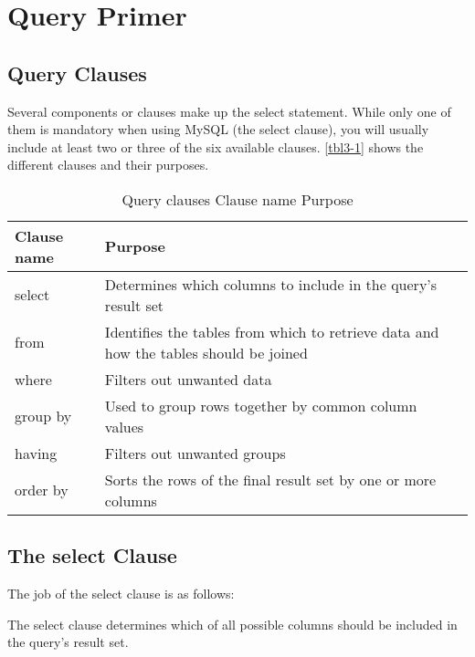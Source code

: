 \chapter{Query Primer\label{Ch03}}
\section{Query Clauses}
Several components or clauses make up the select statement. While only one of them is mandatory when using MySQL (the select clause), you will usually include at least two or three of the six available clauses. \autoref{tbl3-1} shows the different clauses and their purposes.
\begin{table}
    \centering
    \caption{Query clauses Clause name Purpose}
    \label{tbl3-1}
    \begin{tabular}{ll}
        \hline
        Clause name & Purpose                                                                               \\
        \hline
        select      & Determines which columns to include in the query's result set                         \\
        from        & Identifies the tables from which to retrieve data and how the tables should be joined \\
        where       & Filters out unwanted data                                                             \\
        group by    & Used to group rows together by common column values                                   \\
        having      & Filters out unwanted groups                                                           \\
        order by    & Sorts the rows of the final result set by one or more columns                         \\
        \hline
    \end{tabular}
\end{table}

\section{The select Clause}
The job of the select clause is as follows:
\begin{tcolorbox}
    The select clause determines which of all possible columns should be included in the query's result set.
\end{tcolorbox}

